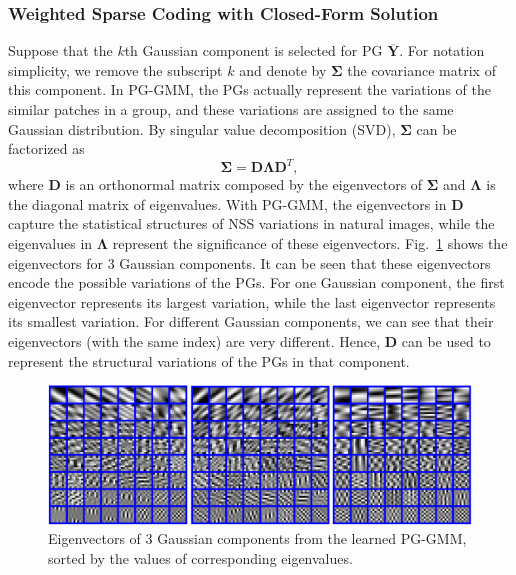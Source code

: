 \subsubsection{Weighted Sparse Coding with Closed-Form Solution}
Suppose that the $k$th Gaussian component is selected for PG $\bm{\overline{Y}}$. For notation simplicity, we remove the subscript $k$ and denote by $\bm{\Sigma}$ the covariance matrix of this component. In PG-GMM, the PGs actually represent the variations of the similar patches in a group, and these variations are assigned to the same Gaussian distribution. By singular value decomposition (SVD), $\bm{\Sigma}$ can be factorized as
\begin{equation}
\label{equ2-10}
\bm{\Sigma} = \bm{D}\bm{\Lambda}\bm{D}^{T},
\end{equation}
where $\bm{D}$ is an orthonormal matrix composed by the eigenvectors of $\bm{\Sigma}$ and $\bm{\Lambda}$ is the diagonal matrix of eigenvalues. With PG-GMM, the eigenvectors  in $\bm{D}$ capture the statistical structures of NSS variations in natural images, while the eigenvalues in $\bm{\Lambda}$ represent the significance of these eigenvectors. Fig.\ \ref{fig2-4} shows the eigenvectors for 3 Gaussian components. It can be seen that these eigenvectors encode the possible variations of the PGs. For one Gaussian component, the first eigenvector represents its largest variation, while the last eigenvector represents its smallest variation. For different Gaussian components, we can see that their eigenvectors (with the same index) are very different. Hence, $\bm{D}$ can be used to represent the structural variations of the PGs in that component.
\begin{figure}[t!]
\centering
\includegraphics[width=1\linewidth]{images/pgpd/dics.png}
\vspace{-5mm}
\caption{Eigenvectors of 3 Gaussian components from the learned PG-GMM, sorted by the values of corresponding eigenvalues.}
\label{fig2-4}
\end{figure}

